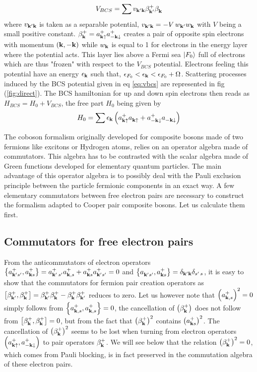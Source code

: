 \documentclass[aps,pra,amsmath,amssymb,preprint,groupedaddress]{revtex4}
\begin{document}
\begin{equation}\label{eq:vbcs}
V_{BCS}=\sum{v_{\ensuremath{\mathbf{k}}'\ensuremath{\mathbf{k}}}\beta^+_{\ensuremath{\mathbf{k}}'}\beta^{}_{\ensuremath{\mathbf{k}}}}
\end{equation}
where $v_{\mathbf{k}'\mathbf{k}}$ is taken as a separable potential, $v_{\mathbf{k}'\mathbf{k}}=-V\,w_{\mathbf{k}'}w_{\mathbf{k}}$ with $V$ being a small positive constant.  $\beta^+_{\mathbf{k}}=a^+_{\mathbf{k}\uparrow}a^+_{-\mathbf{k}\downarrow}$ creates a pair of opposite spin electrons with momentum $\left(\mathbf{k},-\mathbf{k}\right)$ while $w_{\mathbf{k}}$ is equal to 1 for electrons in the energy layer where the potential acts. This layer lies above a Fermi sea $\left|F_0\right>$ full of electrons which are thus "frozen" with respect to the $V_{BCS}$ potential.  Electrons feeling this potential have an energy $\epsilon_{\mathbf{k}}$ such that,  $\epsilon_{F_0}<\epsilon_{\mathbf{k}}<\epsilon_{F_0}+\Omega$. Scattering processes induced by the BCS potential given in eq \eqref{eq:vbcs} are represented in fig (\ref{fig:direct}).  The BCS hamiltonian for up and down spin electrons then reads as $H_{BCS}=H_0+V_{BCS}$, the free part $H_0$ being given by
\begin{equation}
H_0=\sum{\epsilon_{\ensuremath{\mathbf{k}}}\ensuremath{\left(a^+_{\mathbf{k}\uparrow} a^{}_{\mathbf{k}\uparrow}+a^+_{-\mathbf{k}\downarrow} a^{}_{-\mathbf{k}\downarrow}\right)}}
\end{equation}

 The coboson formalism \cite{CobosonPhysicsReports} originally developed for composite bosons  made of two fermions like  excitons or Hydrogen atoms, relies on an operator algebra made of commutators.  This algebra has to be contrasted with the scalar algebra made of Green functions developed for elementary quantum particles.  The main advantage of this operator algebra is to possibly deal with the Pauli exclusion principle between the particle fermionic components in an exact way.  A few elementary commutators between free electron pairs are necessary to construct the formalism adapted to Cooper pair composite bosons.  Let us calculate them first.

\subsection{Commutators for free electron pairs}

From the anticommutators of electron operators $\left\{a^+_{\mathbf{k}'{}s'},a^+_{\mathbf{k}{}s}\right\}=a^+_{\mathbf{k}'\,s'}a^+_{\mathbf{k},s}+a^+_{\mathbf{k}{}s}a^+_{\mathbf{k}'{}s'}=0$ and $\left\{a^{}_{\mathbf{k}'{}s'},a^+_{\mathbf{k}{}s}\right\}=\delta_{\mathbf{k}'\mathbf{k}}\delta_{s'\,s}$, it is easy to show that the commutators for fermion pair creation operators as $\left[\beta^+_{\mathbf{k}'},\beta^+_{\mathbf{k}}\right]=\beta^+_{\mathbf{k}'}\beta^+_{\mathbf{k}}-\beta^+_{\mathbf{k}}\beta^+_{\mathbf{k}'}$ reduces to zero. Let us however note that $\left(a^+_{\mathbf{k},s}\right)^2=0$ simply follows from  $\left\{a^+_{\mathbf{k},s},a^+_{\mathbf{k},s}\right\}=0$, the cancellation of $\left(\beta^+_{\mathbf{k}}\right)$ does not follow from $\left[\beta^+_{\mathbf{k}},\beta^+_{\mathbf{k}}\right]=0$, but from the fact that  $\left(\beta^+_{\mathbf{k}}\right)^2$ contains $\left(a^+_{\mathbf{k}{}s}\right)^2$.  The cancellation of $\left(\beta^+_{\mathbf{k}}\right)^2$ seems to be lost when turning from electron operators $\left(a^+_{\mathbf{k}\uparrow},a^+_{-\mathbf{k}\downarrow}\right)$ to pair operators  $\beta^+_{\mathbf{k}}$. We will see below that the relation $\left(\beta^+_{\mathbf{k}}\right)^2=0$, which comes from Pauli blocking, is in fact preserved in the commutation algebra of these electron pairs. 
\end{document}

